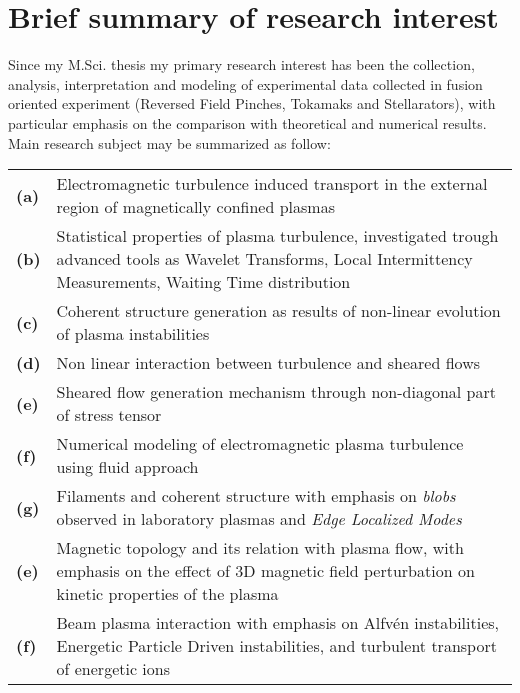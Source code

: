 \section{Brief summary of research interest}
Since my M.Sci. thesis my primary research interest has been the
collection, analysis, interpretation and modeling of experimental data
collected in fusion oriented experiment (Reversed Field Pinches,
Tokamaks and Stellarators), with particular emphasis on the comparison
with theoretical and numerical results. Main research subject may be summarized as follow: 

\begin{longtable}{>{\bfseries}l p{17cm}}
(a) & Electromagnetic turbulence induced transport in the
  external region of magnetically confined plasmas \\
(b) & Statistical properties of plasma turbulence, investigated
  trough advanced tools as Wavelet Transforms, Local Intermittency
  Measurements, Waiting Time distribution \\
(c) & Coherent structure generation as results of non-linear
  evolution of plasma instabilities \\
(d) & Non linear interaction between turbulence and sheared flows \\
(e) & Sheared flow generation mechanism through non-diagonal part
  of stress tensor \\
(f) & Numerical modeling of electromagnetic plasma turbulence
  using fluid approach \\
(g) & Filaments and coherent structure with emphasis on
  \emph{blobs} observed in laboratory plasmas and \emph{Edge Localized
  Modes} \\
(e) & Magnetic topology and its relation with plasma flow, with
emphasis on the effect of 3D magnetic field perturbation on kinetic
properties of the plasma \\
(f) & Beam plasma interaction with emphasis on Alfv\'en instabilities,
Energetic Particle Driven instabilities, and turbulent transport of
energetic ions
\end{longtable}

